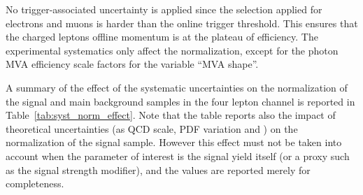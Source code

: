 No trigger-associated uncertainty is applied since the \pt selection applied for electrons and muons
is harder than the online trigger threshold.
This ensures that the charged leptons offline momentum is at the plateau of efficiency.
The experimental systematics only affect the normalization,
except for the photon MVA efficiency scale factors for the variable ``MVA shape''.

A summary of the effect of the systematic uncertainties on the normalization
of the signal and main background samples in the four lepton channel is reported in Table~\ref{tab:syst_norm_effect}.
Note that the table reports also the impact of theoretical uncertainties
(\ie as QCD scale, PDF variation and \alpS) on the normalization of the signal sample.
However this effect must not be taken into account when the parameter of interest is the
signal yield itself (or a proxy such as the signal strength modifier),
and the values are reported merely for completeness.

